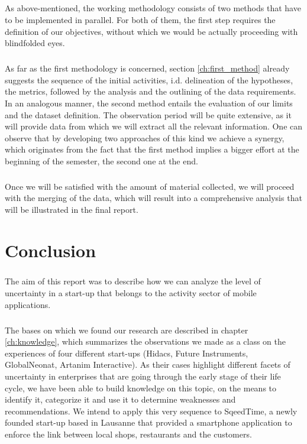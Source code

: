 \documentclass[twoside]{report}
\begin{document}
	\paragraph{}
	As above-mentioned, the working methodology consists of two methods that have to be implemented in parallel. For both of them, the first step requires the definition of our objectives, without which we would be actually proceeding with blindfolded eyes.
	\paragraph{}
	As far as the first methodology is concerned, section \ref{ch:first_method} already suggests the sequence of the initial activities, i.d. delineation of the hypotheses, the metrics, followed by the analysis and the outlining of the data requirements. In an analogous manner, the second method entails the evaluation of our limits and the dataset definition. The observation period will be quite extensive, as it will provide data from which we will extract all the relevant information. One can observe that by developing two approaches of this kind we achieve a synergy, which originates from the fact that the first method implies a bigger effort at the beginning of the semester, the second one at the end.
	\paragraph{}
	Once we will be satisfied with the amount of material collected, we will proceed with the merging of the data, which will result into a comprehensive analysis that will be illustrated in the final report.





	\chapter*{Conclusion}
	\paragraph{}
	The aim of this report was to describe how we can analyze the level of uncertainty in a start-up that belongs to the activity sector of mobile applications. 
	\paragraph{}
	The bases on which we found our research are described in chapter \ref{ch:knowledge}, which summarizes the observations we made as a class on the experiences of four different start-ups (Hidacs, Future Instruments, GlobalNeonat, Artanim Interactive). As their cases highlight different facets of uncertainty in enterprises that are going through the early stage of their life cycle, we have been able to build knowledge on this topic, on the means to identify it, categorize it and use it to determine weaknesses and recommendations. We intend to apply this very sequence to SqeedTime, a newly founded start-up based in Lausanne that provided a smartphone application to enforce the link between local shops, restaurants and the customers. 
\end{document}
